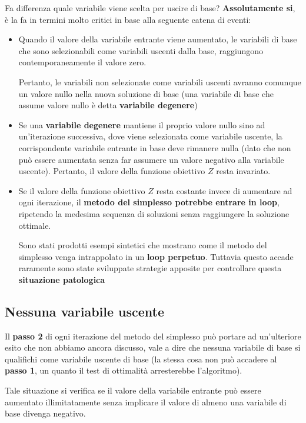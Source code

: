Fa differenza quale variabile viene scelta per uscire di base? \textbf{Assolutamente si}, è la fa in termini molto critici in base alla seguente catena di eventi:
\begin{itemize}
    \item Quando il valore della variabile entrante viene aumentato, le variabili di base che sono selezionabili come variabili uscenti dalla base, raggiungono contemporaneamente il valore zero.

    Pertanto, le variabili non selezionate come variabili uscenti avranno comunque un valore nullo nella nuova soluzione di base (una variabile di base che assume valore nullo è detta \textbf{variabile degenere})
   
   \item Se una \textbf{variabile degenere} mantiene il proprio valore nullo sino ad un'iterazione successiva, dove viene selezionata come variabile uscente, la corrispondente variabile entrante in base deve rimanere nulla (dato che non può essere aumentata senza far assumere un valore negativo alla variabile uscente). Pertanto, il valore della funzione obiettivo $Z$ resta invariato.
   
   \item Se il valore della funzione obiettivo $Z$ resta costante invece di aumentare ad ogni iterazione, il \textbf{metodo del simplesso potrebbe entrare in loop}, ripetendo la medesima sequenza di soluzioni senza raggiungere la soluzione ottimale.
   
   Sono stati prodotti esempi sintetici che mostrano come il metodo del simplesso venga intrappolato in un \textbf{loop perpetuo}. Tuttavia questo accade raramente sono state sviluppate strategie apposite per controllare questa \textbf{situazione patologica}
\end{itemize}

\subsection{Nessuna variabile uscente}
Il \textbf{passo 2} di ogni iterazione del metodo del simplesso può portare ad un'ulteriore esito che non abbiamo ancora discusso, vale a dire che nessuna variabile di base si qualifichi come variabile uscente di base (la stessa cosa non può accadere al \textbf{passo 1}, un quanto il test di ottimalità arresterebbe l'algoritmo).

Tale situazione si verifica se il valore della variabile entrante può essere aumentato illimitatamente senza implicare il valore di almeno una variabile di base divenga negativo.

